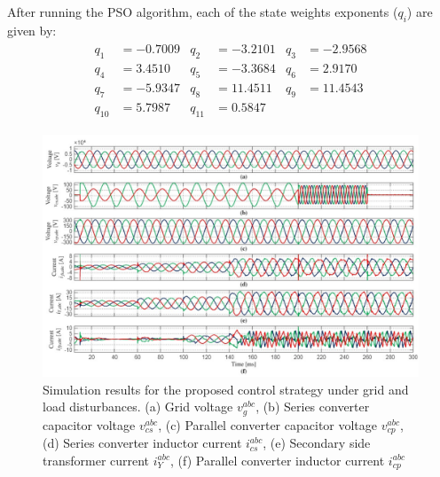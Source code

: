 After running the PSO algorithm, each of the state weights exponents ($q_i$) are given by:
\begin{align}
    \begin{aligned}
        q_1 &= -0.7009 & q_2 &= -3.2101 & q_3 &= -2.9568\\
        q_4 &= 3.4510 & q_5 &= -3.3684 & q_6 &= 2.9170\\
        q_7 &= -5.9347 & q_8 &= 11.4511 & q_9&= 11.4543\\
        q_{10} &= 5.7987 & q_{11} &= 0.5847
    \end{aligned}
\end{align}

\begin{figure}
    \centering
    \includegraphics[width=\textwidth]{Images/Simulation_Results.pdf}
    \caption{Simulation results for the proposed control strategy under grid and load disturbances. (a) Grid voltage $v_g^{abc}$, (b) Series converter capacitor voltage $v_{cs}^{abc}$, (c) Parallel converter capacitor voltage $v_{cp}^{abc}$, (d) Series converter inductor current $i_{cs}^{abc}$, (e) Secondary side transformer current $i_Y^{abc}$, (f) Parallel converter inductor current $i_{cp}^{abc}$}
    \label{fig:Sim_results}
\end{figure}